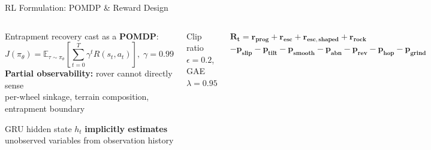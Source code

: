 \documentclass[aspectratio=169, 10pt]{beamer}
\newcommand{\keyword}[1]{\textbf{\color{MarsLight}#1}}
\newcommand{\teal}[1]{{\color{ArcticTeal}#1}}
\begin{document}
\begin{frame}{RL Formulation: POMDP \& Reward Design}
\begin{columns}[T]
  \begin{tcolorbox}[mycard, title={\faBrain\; POMDP Formulation}]
    \scriptsize
    Entrapment recovery cast as a \keyword{POMDP}:
    \[
      J(\pi_\theta) = \mathbb{E}_{\tau \sim \pi_\theta}
      \!\left[\sum_{t=0}^{T} \gamma^t R(s_t, a_t)\right],\;\gamma = 0.99
    \]
    \medskip
    \textbf{Partial observability:} rover cannot directly sense\\
    per-wheel sinkage, terrain composition, entrapment boundary
    \medskip

    \teal{\faArrowRight} GRU hidden state $h_t$ \keyword{implicitly estimates} unobserved variables from observation history
  \end{tcolorbox}

  \vspace{-0.8em}
  \begin{tcolorbox}[mycard, title={\faBolt\; PPO Clipped Objective}]
    \scriptsize
    \vspace{2pt}
    \centering Clip ratio $\epsilon = 0.2$,\; GAE $\lambda = 0.95$
  \end{tcolorbox}

  \begin{tcolorbox}[enhanced,
                    colback=SpaceBlack, colframe=MarsRust,
                    boxrule=1pt, arc=4pt,
                    left=4pt, right=4pt, top=6pt, bottom=6pt,
                    width=\linewidth,
                    halign=center]
    \textcolor{StarWhite}{\scriptsize
      $\mathbf{R_t = r_{prog} + r_{esc} + r_{esc,shaped} + r_{rock}}$
      $\mathbf{- p_{slip} - p_{tilt} - p_{smooth} - p_{abn} - p_{rev} - p_{hop} - p_{grind}}$
    }
  \end{tcolorbox}

  \vspace{0.25em}


\end{columns}
\end{frame}
\end{document}
